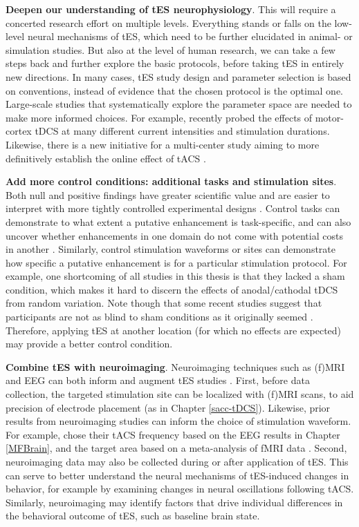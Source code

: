 \documentclass[11pt,english,]{memoir}
\begin{document}
\textbf{Deepen our understanding of tES neurophysiology}. This will require a concerted research effort on multiple levels. Everything stands or falls on the low-level neural mechanisms of tES, which need to be further elucidated in animal- or simulation studies. But also at the level of human research, we can take a few steps back and further explore the basic protocols, before taking tES in entirely new directions. In many cases, tES study design and parameter selection is based on conventions, instead of evidence that the chosen protocol is the optimal one. Large-scale studies that systematically explore the parameter space are needed to make more informed choices. For example, \textcite{Samani2019} recently probed the effects of motor-cortex tDCS at many different current intensities and stimulation durations. Likewise, there is a new initiative for a multi-center study aiming to more definitively establish the online effect of tACS \autocite{TACSchallenge}.

\textbf{Add more control conditions: additional tasks and stimulation sites}. Both null and positive findings have greater scientific value and are easier to interpret with more tightly controlled experimental designs \autocites{DeGraaf2018}{Parkin2015}{Polania2018}. Control tasks can demonstrate to what extent a putative enhancement is task-specific, and can also uncover whether enhancements in one domain do not come with potential costs in another \autocites{Brem2014a}{Iuculano2013}. Similarly, control stimulation waveforms or sites can demonstrate how specific a putative enhancement is for a particular stimulation protocol. For example, one shortcoming of all studies in this thesis is that they lacked a sham condition, which makes it hard to discern the effects of anodal/cathodal tDCS from random variation. Note though that some recent studies suggest that participants are not as blind to sham conditions as it originally seemed \autocites{Turi2019}{Greinacher2018}. Therefore, applying tES at another location (for which no effects are expected) may provide a better control condition.

\textbf{Combine tES with neuroimaging}. Neuroimaging techniques such as (f)MRI and EEG can both inform and augment tES studies \autocites{Bergmann2016}{Thut2017}. First, before data collection, the targeted stimulation site can be localized with (f)MRI scans, to aid precision of electrode placement (as in Chapter \ref{sacc-tDCS}). Likewise, prior results from neuroimaging studies can inform the choice of stimulation waveform. For example, \textcite{VanSchouwenburg2019} chose their tACS frequency based on the EEG results in Chapter \ref{MFBrain}, and the target area based on a meta-analysis of fMRI data \autocite{Langner2012}. Second, neuroimaging data may also be collected during or after application of tES. This can serve to better understand the neural mechanisms of tES-induced changes in behavior, for example by examining changes in neural oscillations following tACS. Similarly, neuroimaging may identify factors that drive individual differences in the behavioral outcome of tES, such as baseline brain state.
\end{document}
